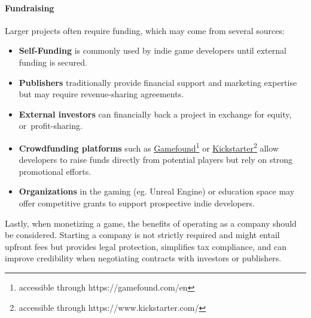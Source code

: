 \paragraph{Fundraising} Larger projects often require funding, which may come from several sources:
\begin{itemize}
	\item \textbf{Self-Funding} is commonly used by indie game developers until external funding is secured.\cite{perforce-stoftware_tips}
	\item \textbf{Publishers} traditionally provide financial support and marketing expertise but may require revenue-sharing agreements.\cite{perforce-stoftware_tips}
	\item \textbf{External investors} can financially back a project in exchange for equity, or~profit-sharing.\cite{perforce-stoftware_tips}
	\item \textbf{Crowdfunding platforms} such as \href{https://gamefound.com/en}{Gamefound}\footnote{accessible through https://gamefound.com/en} or \href{https://www.kickstarter.com/}{Kickstarter}\footnote{accessible through https://www.kickstarter.com/} allow developers to raise funds directly from potential players but rely on strong promotional efforts.\cite{perforce-stoftware_tips}
	\item \textbf{Organizations} in the gaming (eg. Unreal Engine) or education space may offer competitive grants to support prospective indie developers.\cite{perforce-stoftware_tips, unreal-engine_grants}
\end{itemize}

Lastly, when monetizing a game, the benefits of operating as a company should be considered. Starting a company is not strictly required and might entail upfront fees but provides legal protection, simplifies tax compliance, and can improve credibility when negotiating contracts with investors or publishers.\cite{expats_company-or-individual}